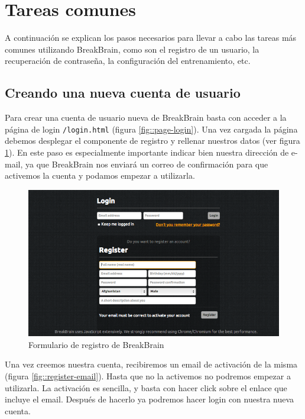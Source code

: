 \section{Tareas comunes}

A continuación se explican los pasos necesarios para llevar a cabo las tareas más comunes utilizando BreakBrain, como son el registro de un usuario, la recuperación de contraseña, la configuración del entrenamiento, etc.

\subsection{Creando una nueva cuenta de usuario}

Para crear una cuenta de usuario nueva de BreakBrain basta con acceder a la página de login {\tt /login.html} (figura \ref{fig::page-login}). Una vez cargada la página debemos desplegar el componente de registro y rellenar nuestros datos (ver figura \ref{fig::page-register}). En este paso es especialmente importante indicar bien nuestra dirección de e-mail, ya que BreakBrain nos enviará un correo de confirmación para que activemos la cuenta y podamos empezar a utilizarla.

\begin{figure}[h]
  \begin{center}
    \includegraphics[width=\textwidth]{./images/page-register.png}
  \end{center}  
  \caption{Formulario de registro de BreakBrain}
  \label{fig::page-register}
\end{figure}

Una vez creemos nuestra cuenta, recibiremos un email de activación de la misma (figura \ref{fig::register-email}). Hasta que no la activemos no podremos empezar a utilizarla. La activación es sencilla, y basta con hacer click sobre el enlace que incluye el email. Después de hacerlo ya podremos hacer login con nuestra nueva cuenta.

